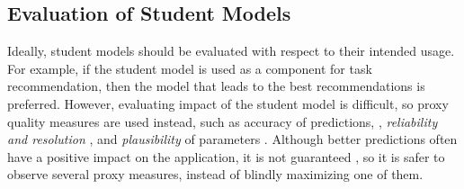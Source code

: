 %


\subsection{Evaluation of Student Models}
\label{sec:student-model-evaluation}

Ideally, student models should be evaluated with respect to their intended usage.
For example, if the student model is used as a component for task recommendation,
then the model that leads to the best recommendations is preferred.
However, evaluating impact of the student model is difficult, %
so proxy quality measures are used instead,
such as accuracy of predictions,
\cite[section 3]{pelanek-evaluation-student-models},
\emph{reliability and resolution} %
\cite[section 5]{pelanek-evaluation-student-models},
and \emph{plausibility} of parameters \cite{learner-models-integration-skills}.
Although better predictions often have a positive impact on the application,
it is not guaranteed \cite{evaluation-leopard},
so it is safer to observe several proxy measures,
instead of blindly maximizing one of them. %

